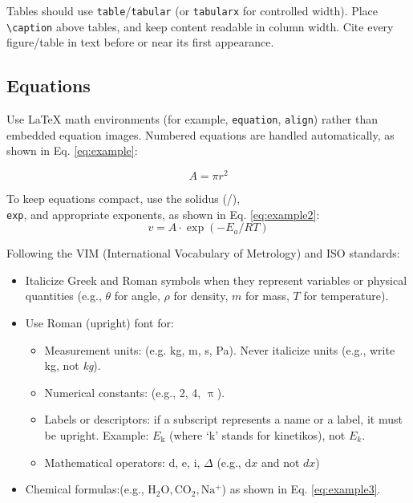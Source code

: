 \documentclass{imeko_wc}
\begin{document}
Tables should use \verb|table|/\verb|tabular| (or \verb|tabularx| for controlled width). Place \verb|\caption| above tables, and keep content readable in column width. Cite every figure/table in text before or near its first appearance.

\subsection{Equations}

Use \LaTeX{} math environments (for example, \verb|equation|, \verb|align|) rather than embedded equation images. Numbered equations are handled automatically, as shown in Eq. \eqref{eq:example}:

\begin{equation}
\label{eq:example}
A = \pi  r^2
\end{equation}

To keep equations compact, use the solidus (/), \texttt{\\exp}, and appropriate exponents, as shown in Eq. \eqref{eq:example2}:
\begin{equation}
\label{eq:example2}
v=A \cdot \exp(-E_a/RT)
\end{equation}

Following the VIM (International Vocabulary of Metrology) and ISO standards:
\begin{itemize}
	\item Italicize Greek and Roman symbols when they represent variables or physical quantities (e.g.,  $\theta$ for angle,  $\rho$ for density, $m$ for mass, $T$ for temperature).
	\item Use Roman (upright) font for:
		\begin{itemize}
			\item Measurement units: (e.g. kg, m, s, Pa). Never italicize units (e.g., write kg, not \textit{kg}).
			\item Numerical constants: (e.g., 2, 4, $\uppi$).
			\item Labels or descriptors: if a subscript represents a name or a label, it must be upright. Example: $E_\mathrm{k}$ (where ‘k’ stands for kinetikos), not $E_k$.
			\item Mathematical operators: d, e, i, $\Delta$ (e.g., $\mathrm{d}x$ and not $dx$)
		\end{itemize}
	\item Chemical formulas:(e.g., $\mathrm{H_2O}, \mathrm{CO_2}, \mathrm{Na^+}$) as shown in Eq. \eqref{eq:example3}.
\end{itemize}
\end{document}
